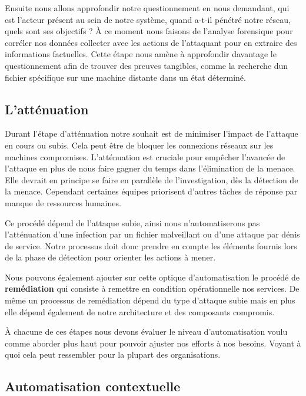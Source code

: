\documentclass[
  11pt,
  a4paper,
  krantz2,
  11pt,
  oneside]{krantz}
\begin{document}
Ensuite nous allons approfondir notre questionnement en nous demandant, qui est l'acteur présent au sein de notre système, quand a-t-il pénétré notre réseau, quels sont ses objectifs ? À ce moment nous faisons de l'analyse forensique pour corréler nos données collecter avec les actions de l'attaquant pour en extraire des informations factuelles. Cette étape nous amène à approfondir davantage le questionnement afin de trouver des preuves tangibles, comme la recherche d\textquotesingle un fichier spécifique sur une machine distante dans un état déterminé.

\subsection{L'atténuation}\label{lattuxe9nuation}

Durant l'étape d'atténuation notre souhait est de minimiser l'impact de l'attaque en cours ou subis. Cela peut être de bloquer les connexions réseaux sur les machines compromises. L'atténuation est cruciale pour empêcher l'avancée de l'attaque en plus de nous faire gagner du temps dans l'élimination de la menace. Elle devrait en principe se faire en parallèle de l'investigation, dès la détection de la menace. Cependant certaines équipes priorisent d'autres tâches de réponse par manque de ressources humaines.

Ce procédé dépend de l'attaque subie, ainsi nous n'automatiserons pas l'atténuation d'une infection par un fichier malveillant ou d'une attaque par dénis de service. Notre processus doit donc prendre en compte les éléments fournis lors de la phase de détection pour orienter les actions à mener.

Nous pouvons également ajouter sur cette optique d'automatisation le procédé de \textbf{remédiation} qui consiste à remettre en condition opérationnelle nos services. De même un processus de remédiation dépend du type d'attaque subie mais en plus elle dépend également de notre architecture et des composants compromis.

À chacune de ces étapes nous devons évaluer le niveau d'automatisation voulu comme aborder plus haut pour pouvoir ajuster nos efforts à nos besoins. Voyant à quoi cela peut ressembler pour la plupart des organisations.

\subsection{Automatisation contextuelle}\label{automatisation-contextuelle}
\end{document}
